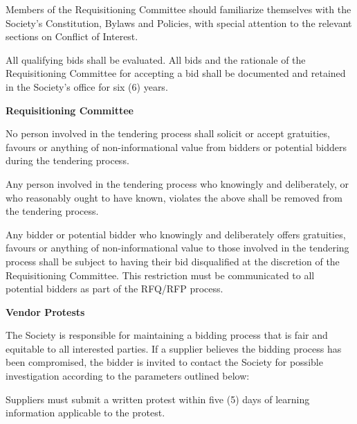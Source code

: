 \begin{longenum}[label*=\thesection.\arabic*., align=left]
\begin{longenum} [label*=\arabic*., align=left]
		\item Members of the Requisitioning Committee should familiarize themselves with the Society's Constitution, Bylaws and Policies, with special attention to the relevant sections on Conflict of Interest.
		\item All qualifying bids shall be evaluated. All bids and the rationale of the Requisitioning Committee for accepting a bid shall be documented and retained in the Society's office for six (6) years.
		
\end{longenum}

\item \textbf{Requisitioning Committee}

\begin{longenum} [label*=\arabic*., align=left]
		\item No person involved in the tendering process shall solicit or accept gratuities, favours or anything of non-informational value from bidders or potential bidders during the tendering process.
		
		\item Any person involved in the tendering process who knowingly and deliberately, or who reasonably ought to have known, violates the above shall be removed from the tendering process.
		
		\item Any bidder or potential bidder who knowingly and deliberately offers gratuities, favours or anything of non-informational value to those involved in the tendering process shall be subject to having their bid disqualified at the discretion of the Requisitioning Committee. This restriction must be communicated to all potential bidders as part of the RFQ/RFP process.
\end{longenum}


\item \textbf{Vendor Protests}
\begin{longenum} [label*=\arabic*., align=left]


\item The Society is responsible for maintaining a bidding process that is fair and equitable to all interested parties. If a supplier believes the bidding process has been compromised, the bidder is invited to contact the Society for possible investigation according to the parameters outlined below:

\item Suppliers must submit a written protest within five (5) days of learning information applicable to the protest.


\end{longenum}
\end{longenum}
